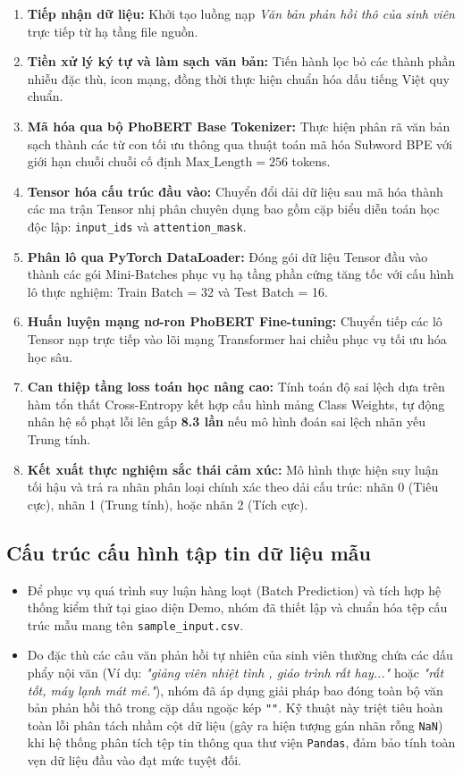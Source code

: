 \documentclass[conference,10pt,a4paper]{IEEEtran}
\begin{document}
\begin{enumerate}
    \item \textbf{Tiếp nhận dữ liệu:} Khởi tạo luồng nạp \textit{Văn bản phản hồi thô của sinh viên} trực tiếp từ hạ tầng file nguồn.
    \item \textbf{Tiền xử lý ký tự và làm sạch văn bản:} Tiến hành lọc bỏ các thành phần nhiễu đặc thù, icon mạng, đồng thời thực hiện chuẩn hóa dấu tiếng Việt quy chuẩn.
    \item \textbf{Mã hóa qua bộ PhoBERT Base Tokenizer:} Thực hiện phân rã văn bản sạch thành các từ con tối ưu thông qua thuật toán mã hóa Subword BPE với giới hạn chuỗi chuỗi cố định $\text{Max\_Length} = 256$ tokens.
    \item \textbf{Tensor hóa cấu trúc đầu vào:} Chuyển đổi dải dữ liệu sau mã hóa thành các ma trận Tensor nhị phân chuyên dụng bao gồm cặp biểu diễn toán học độc lập: \texttt{input\_ids} và \texttt{attention\_mask}.
    \item \textbf{Phân lô qua PyTorch DataLoader:} Đóng gói dữ liệu Tensor đầu vào thành các gói Mini-Batches phục vụ hạ tầng phần cứng tăng tốc với cấu hình lô thực nghiệm: Train Batch = 32 và Test Batch = 16.
    \item \textbf{Huấn luyện mạng nơ-ron PhoBERT Fine-tuning:} Chuyển tiếp các lô Tensor nạp trực tiếp vào lõi mạng Transformer hai chiều phục vụ tối ưu hóa học sâu.
    \item \textbf{Can thiệp tầng loss toán học nâng cao:} Tính toán độ sai lệch dựa trên hàm tổn thất Cross-Entropy kết hợp cấu hình mảng Class Weights, tự động nhân hệ số phạt lỗi lên gấp \textbf{8.3 lần} nếu mô hình đoán sai lệch nhãn yếu Trung tính.
    \item \textbf{Kết xuất thực nghiệm sắc thái cảm xúc:} Mô hình thực hiện suy luận tối hậu và trả ra nhãn phân loại chính xác theo dải cấu trúc: nhãn 0 (Tiêu cực), nhãn 1 (Trung tính), hoặc nhãn 2 (Tích cực).
\end{enumerate}

\subsection{Cấu trúc cấu hình tập tin dữ liệu mẫu}
\begin{itemize}
    \item Để phục vụ quá trình suy luận hàng loạt (Batch Prediction) và tích hợp hệ thống kiểm thử tại giao diện Demo, nhóm đã thiết lập và chuẩn hóa tệp cấu trúc mẫu mang tên \texttt{sample\_input.csv}.
    \item Do đặc thù các câu văn phản hồi tự nhiên của sinh viên thường chứa các dấu phẩy nội văn (Ví dụ: \textit{"giảng viên nhiệt tình , giáo trình rất hay..."} hoặc \textit{"rất tốt, máy lạnh mát mẻ."}), nhóm đã áp dụng giải pháp bao đóng toàn bộ văn bản phản hồi thô trong cặp dấu ngoặc kép \texttt{""}. Kỹ thuật này triệt tiêu hoàn toàn lỗi phân tách nhầm cột dữ liệu (gây ra hiện tượng gán nhãn rỗng \texttt{NaN}) khi hệ thống phân tích tệp tin thông qua thư viện \texttt{Pandas}, đảm bảo tính toàn vẹn dữ liệu đầu vào đạt mức tuyệt đối.
\end{itemize}
\end{document}
